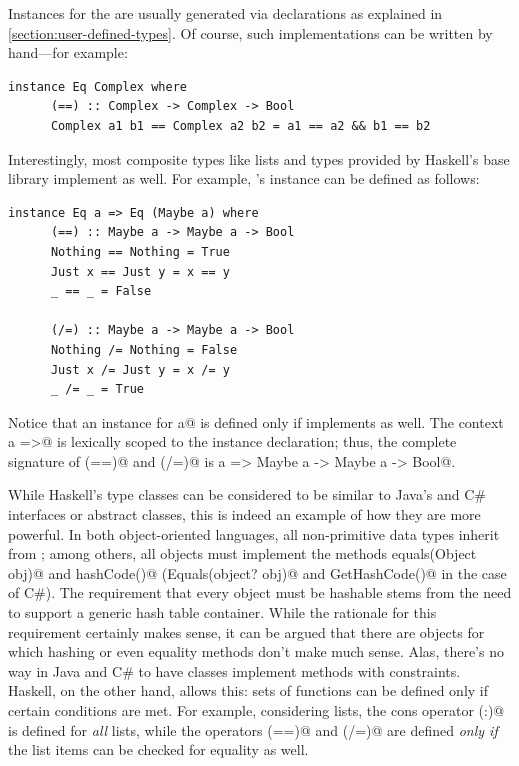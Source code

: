 \documentclass[UdineBachThesis,american,11pt]{PhdThesis}
\begin{document}
  Instances for the \lstinline@Eq@ are usually generated via
  \lstinline@deriving@ declarations as explained in
  \autoref{section:user-defined-types}. Of course, such implementations can be
  written by hand---for example:

  \begin{lstlisting}[gobble=4,basicstyle=\ttfamily\small]
    instance Eq Complex where
      (==) :: Complex -> Complex -> Bool
      Complex a1 b1 == Complex a2 b2 = a1 == a2 && b1 == b2
  \end{lstlisting}

  Interestingly, most composite types like lists and types provided by Haskell's
  base library implement \lstinline@Eq@ as well. For example,
  \lstinline@Maybe@'s instance can be defined as follows:

  \begin{lstlisting}[gobble=4,basicstyle=\ttfamily\small]
    instance Eq a => Eq (Maybe a) where
      (==) :: Maybe a -> Maybe a -> Bool
      Nothing == Nothing = True
      Just x == Just y = x == y
      _ == _ = False

      (/=) :: Maybe a -> Maybe a -> Bool
      Nothing /= Nothing = False
      Just x /= Just y = x /= y
      _ /= _ = True
  \end{lstlisting}

  Notice that an \lstinline@Eq@ instance for \lstinline@Maybe a@ is defined only
  if \lstinline@a@ implements \lstinline@Eq@ as well. The context
  \lstinline@Eq a =>@ is lexically scoped to the instance declaration; thus, the
  complete signature of \lstinline@(==)@ and \lstinline@(/=)@ is
  \lstinline@Eq a => Maybe a -> Maybe a -> Bool@.

  While Haskell's type classes can be considered to be similar to Java's and C\#
  interfaces or abstract classes, this is indeed an example of how they are more
  powerful. In both object-oriented languages, all non-primitive data types
  inherit from \lstinline@Object@; among others, all objects must implement the
  methods \lstinline@boolean equals(Object obj)@ and \lstinline@int hashCode()@
  (\lstinline@bool Equals(object? obj)@ and \lstinline@int GetHashCode()@ in the
  case of C\#). The requirement that every object must be hashable stems from
  the need to support a generic hash table container. While the rationale for
  this requirement certainly makes sense, it can be argued that there are
  objects for which hashing or even equality methods don't make much sense.
  Alas, there's no way in Java and C\# to have classes implement methods with
  constraints. Haskell, on the other hand, allows this: sets of functions can be
  defined only if certain conditions are met. For example, considering lists,
  the cons operator \lstinline@(:)@ is defined for \emph{all} lists, while the
  operators \lstinline@(==)@ and \lstinline@(/=)@ are defined \emph{only if} the
  list items can be checked for equality as well.
\end{document}
